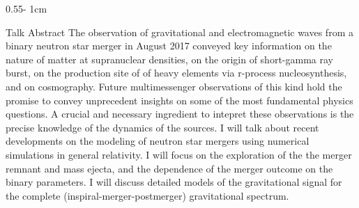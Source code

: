 \documentclass{../psuposter}
\begin{document}
\begin{frame}
\begin{columns}
\begin{column}{0.55\textwidth - 1cm}
    \begin{block}{Talk Abstract}
        The observation of gravitational and electromagnetic waves from a binary neutron star merger in August 2017 conveyed key information on the nature of matter at supranuclear densities, on the origin of short-gamma ray burst, on the production site of of heavy elements via r-process nucleosynthesis, and on cosmography. Future multimessenger observations of this kind hold the promise to convey unprecedent insights on some of the most fundamental physics questions. A crucial and necessary ingredient to intepret these observations is the precise knowledge of the dynamics of the sources. I will talk about recent developments on the modeling of neutron star mergers using numerical simulations in general relativity. I will focus on the exploration of the the merger remnant and mass ejecta, and the dependence of the merger outcome on the binary parameters. I will discuss detailed models of the gravitational signal for the complete (inspiral-merger-postmerger) gravitational spectrum.    
    \end{block}



\end{column}
\end{columns}
\end{frame}
\end{document}
